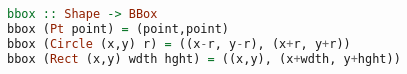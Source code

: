 \begin{lstlisting}[language=haskell]
bbox :: Shape -> BBox
bbox (Pt point) = (point,point)
bbox (Circle (x,y) r) = ((x-r, y-r), (x+r, y+r))
bbox (Rect (x,y) wdth hght) = ((x,y), (x+wdth, y+hght))
\end{lstlisting}